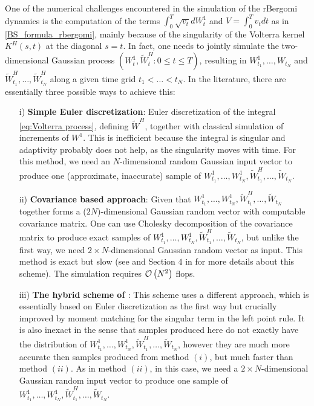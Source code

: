 One of the numerical challenges encountered in the simulation of the rBergomi dynamics  is the computation of the terms  $\int_{0}^{T} \sqrt{v_t} dW_t^1$ and $V=\int_{0}^{T} v_t dt$ as in \eqref{BS_formula_rbergomi}, mainly because of the singularity of the Volterra kernel $K^H(s,t)$ at the diagonal $s = t$. In fact,  one needs to jointly simulate the two-dimensional Gaussian process $(W_t^1, \widetilde{W}^H_t: 0 \le t \le T)$, resulting in $W^1_{t_1},\dots, W_{t_N}$ and $\widetilde{W}^H_{t_1},\dots, \widetilde{W}^H_{t_N}$ along a given time grid $t_1 <\dots < t_N$. In the literature, there are essentially three possible ways to achieve this:
 \begin{enumerate}
 	\item[i)] \textbf{Simple Euler discretization}: Euler discretization of the integral \eqref{eq:Volterra process}, defining $\widetilde{W}^H$, together with classical simulation of increments of $W^1$. This is inefficient because the integral is singular and adaptivity probably does not help, as the singularity moves with time. For this method, we need an $N$-dimensional random Gaussian input vector to produce one (approximate, inaccurate) sample of $W^1_{t_1},\dots, W^1_{t_N}, \widetilde{W}^H_{t_1},\dots, \widetilde{W}_{t_N}$.
 	
 	\item[ii)] \textbf{Covariance based approach}: Given that $W^1_{t_1},\dots, W^1_{t_N}, \widetilde{W}^H_{t_1},\dots, \widetilde{W}_{t_N}$ together forms a ($2N$)-dimensional Gaussian random vector with computable covariance matrix. One can use Cholesky decomposition of the covariance matrix to produce exact samples of $W^1_{t_1},\dots, W^1_{t_N}, \widetilde{W}^H_{t_1},\dots, \widetilde{W}_{t_N}$, but unlike the first way, we need $2 \times N$-dimensional Gaussian random vector as
 	input. This method is exact but slow (see  \cite{bayer2016pricing} and Section $4$ in \cite{bayer2017short} for more details about this scheme). The simulation  requires ${\mathcal{O}}\left(N^2\right)$ flops. 
 	
 	\item[iii)]  \textbf{The hybrid scheme of \cite{bennedsen2017hybrid}}: This scheme uses a different approach, which is essentially based on  Euler discretization as the first way but crucially improved by moment
 	matching for the singular term in the left point rule. It is also
 	inexact in the sense that samples produced here do not exactly have the distribution of $W^1_{t_1},\dots, W^1_{t_N}, \widetilde{W}^H_{t_1},\dots, \widetilde{W}_{t_N}$, however they are much more accurate then samples produced from method $(i)$, but much faster than method $(ii)$. As in method $(ii)$, in this case, we need a $2 \times N$-dimensional Gaussian random input vector to produce one
 	sample of $W^1_{t_1},\dots, W^1_{t_N}, \widetilde{W}^H_{t_1},\dots, \widetilde{W}_{t_N}$. 
 \end{enumerate}
